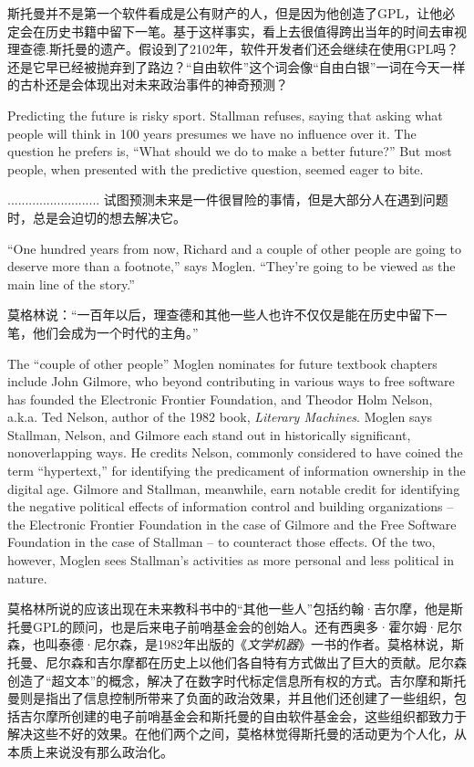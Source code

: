 \ifdefined\chs
斯托曼并不是第一个软件看成是公有财产的人，但是因为他创造了GPL，让他必定会在历史书籍中留下一笔。基于这样事实，看上去很值得跨出当年的时间去审视理查德.斯托曼的遗产。假设到了2102年，软件开发者们还会继续在使用GPL吗？还是它早已经被抛弃到了路边？“自由软件”这个词会像“自由白银”一词在今天一样的古朴还是会体现出对未来政治事件的神奇预测？
\fi

\ifdefined\eng
Predicting the future is risky sport. Stallman refuses, saying that asking what people will think in 100 years presumes we have no influence over it.  The question he prefers is, ``What should we do to make a better future?''  But most people, when presented with the predictive question, seemed eager to bite.
\fi

\ifdefined\chs
..........................
试图预测未来是一件很冒险的事情，但是大部分人在遇到问题时，总是会迫切的想去解决它。
\fi
 
\ifdefined\eng
``One hundred years from now, Richard and a couple of other people are going to deserve more than a footnote,'' says Moglen. ``They're going to be viewed as the main line of the story.''
\fi

\ifdefined\chs
莫格林说：“一百年以后，理查德和其他一些人也许不仅仅是能在历史中留下一笔，他们会成为一个时代的主角。”
\fi

\ifdefined\eng
The ``couple of other people'' Moglen nominates for future textbook chapters include John Gilmore, who beyond contributing in various ways to free software has founded the Electronic Frontier Foundation, and Theodor Holm Nelson, a.k.a. Ted Nelson, author of the 1982 book, \textit{Literary Machines}. Moglen says Stallman, Nelson, and Gilmore each stand out in historically significant, nonoverlapping ways. He credits Nelson, commonly considered to have coined the term ``hypertext,'' for identifying the predicament of information ownership in the digital age. Gilmore and Stallman, meanwhile, earn notable credit for identifying the negative political effects of information control and building organizations -- the Electronic Frontier Foundation in the case of Gilmore and the Free Software Foundation in the case of Stallman -- to counteract those effects. Of the two, however, Moglen sees Stallman's activities as more personal and less political in nature.
\fi

\ifdefined\chs
莫格林所说的应该出现在未来教科书中的“其他一些人”包括约翰·吉尔摩，他是斯托曼GPL的顾问，也是后来电子前哨基金会的创始人。还有西奥多·霍尔姆·尼尔森，也叫泰德·尼尔森，是1982年出版的《\textit{文学机器}》一书的作者。莫格林说，斯托曼、尼尔森和吉尔摩都在历史上以他们各自特有方式做出了巨大的贡献。尼尔森创造了“超文本”的概念，解决了在数字时代标定信息所有权的方式。吉尔摩和斯托曼则是指出了信息控制所带来了负面的政治效果，并且他们还创建了一些组织，包括吉尔摩所创建的电子前哨基金会和斯托曼的自由软件基金会，这些组织都致力于解决这些不好的效果。在他们两个之间，莫格林觉得斯托曼的活动更为个人化，从本质上来说没有那么政治化。
\fi

